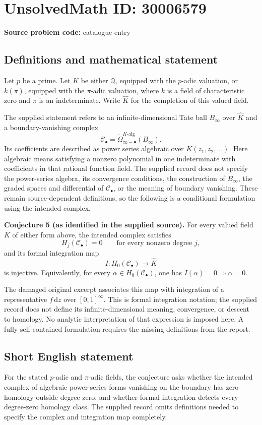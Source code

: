 \documentclass[11pt]{article}
\newcommand{\Q}{\mathbb{Q}}
\begin{document}
\section*{UnsolvedMath ID: 30006579}
\textbf{Source problem code:} catalogue entry
\subsection{Definitions and mathematical statement}
Let \(p\) be a prime. Let \(K\) be either \(\Q\), equipped with the \(p\)-adic valuation, or \(k(\pi)\), equipped with the \(\pi\)-adic valuation, where \(k\) is a field of characteristic zero and \(\pi\) is an indeterminate. Write \(\widehat K\) for the completion of this valued field.

The supplied statement refers to an infinite-dimensional Tate ball \(B_\infty\) over \(\widehat K\) and a boundary-vanishing complex
\[
\mathcal C_\bullet=\widetilde{\Omega}_{\infty-\bullet}^{K\text{-}\mathrm{alg}}(B_\infty).
\]
Its coefficients are described as power series algebraic over \(K(z_1,z_2,\ldots)\). Here algebraic means satisfying a nonzero polynomial in one indeterminate with coefficients in that rational function field. The supplied record does not specify the power-series algebra, its convergence conditions, the construction of \(B_\infty\), the graded spaces and differential of \(\mathcal C_\bullet\), or the meaning of boundary vanishing. These remain source-dependent definitions, so the following is a conditional formulation using the intended complex.

\textbf{Conjecture 5 (as identified in the supplied source).} For every valued field \(K\) of either form above, the intended complex satisfies
\[
H_j(\mathcal C_\bullet)=0\qquad\text{for every nonzero degree }j,
\]
and its formal integration map
\[
I:H_0(\mathcal C_\bullet)\longrightarrow\widehat K
\]
is injective. Equivalently, for every \(\alpha\in H_0(\mathcal C_\bullet)\), one has \(I(\alpha)=0\Rightarrow\alpha=0\).

The damaged original excerpt associates this map with integration of a representative \(f\,\mathrm dz\) over \([0,1]^\infty\). This is formal integration notation; the supplied record does not define its infinite-dimensional meaning, convergence, or descent to homology. No analytic interpretation of that expression is imposed here. A fully self-contained formulation requires the missing definitions from the report.
\subsection{Short English statement}
For the stated \(p\)-adic and \(\pi\)-adic fields, the conjecture asks whether the intended complex of algebraic power-series forms vanishing on the boundary has zero homology outside degree zero, and whether formal integration detects every degree-zero homology class. The supplied record omits definitions needed to specify the complex and integration map completely.
\end{document}
